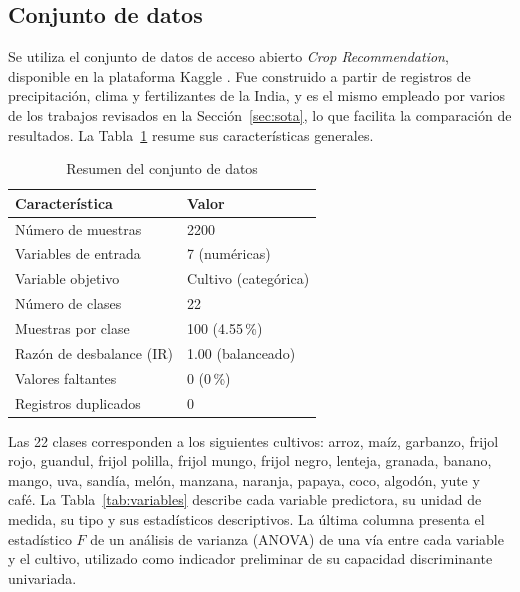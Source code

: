 \documentclass[conference]{IEEEtran}
\begin{document}
\subsection{Conjunto de datos}

Se utiliza el conjunto de datos de acceso abierto \emph{Crop Recommendation}, disponible en la plataforma Kaggle \cite{kumar_dataset}. Fue construido a partir de registros de precipitación, clima y fertilizantes de la India, y es el mismo empleado por varios de los trabajos revisados en la Sección~\ref{sec:sota}, lo que facilita la comparación de resultados. La Tabla~\ref{tab:resumen} resume sus características generales.

\begin{table}[htbp]
\caption{Resumen del conjunto de datos}
\label{tab:resumen}
\centering
\begin{tabular}{ll}
\toprule
\textbf{Característica} & \textbf{Valor} \\
\midrule
Número de muestras & 2200 \\
Variables de entrada & 7 (numéricas) \\
Variable objetivo & Cultivo (categórica) \\
Número de clases & 22 \\
Muestras por clase & 100 (4.55\,\%) \\
Razón de desbalance (IR) & 1.00 (balanceado) \\
Valores faltantes & 0 (0\,\%) \\
Registros duplicados & 0 \\
\bottomrule
\end{tabular}
\end{table}

Las 22 clases corresponden a los siguientes cultivos: arroz, maíz, garbanzo, frijol rojo, guandul, frijol polilla, frijol mungo, frijol negro, lenteja, granada, banano, mango, uva, sandía, melón, manzana, naranja, papaya, coco, algodón, yute y café. La Tabla~\ref{tab:variables} describe cada variable predictora, su unidad de medida, su tipo y sus estadísticos descriptivos. La última columna presenta el estadístico $F$ de un análisis de varianza (ANOVA) de una vía entre cada variable y el cultivo, utilizado como indicador preliminar de su capacidad discriminante univariada.
\end{document}
